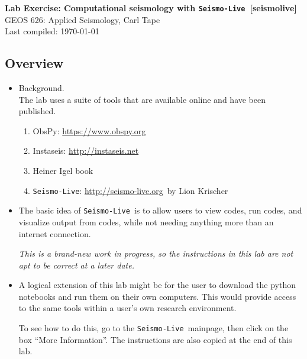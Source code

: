 \documentclass[11pt,titlepage,fleqn]{article}
\newcommand{\slive}{{\tt Seismo-Live}}
\newcommand{\sliveurl}{\url{http://seismo-live.org}}
\begin{document}

\begin{spacing}{1.2}
\centering
{\large \bf Lab Exercise: Computational seismology with \slive\ [seismolive]} \\
GEOS 626: Applied Seismology, Carl Tape \\
Last compiled: \today
\end{spacing}


\subsection*{Overview}

\begin{itemize}

\item Background. \\
The lab uses a suite of tools that are available online and have been published.
\begin{enumerate}
\item ObsPy: \url{https://www.obspy.org} \\
\citet{obspy2010,obspy2011,obspy2015}
\item Instaseis: \url{http://instaseis.net} \\
\citet{instaseis}
\item Heiner Igel book \citep{igel}
\item \slive: \sliveurl\ by Lion Krischer
\end{enumerate}

\item The basic idea of \slive\ is to allow users to view codes, run codes, and visualize output from codes, while not needing anything more than an internet connection.

{\em This is a brand-new work in progress, so the instructions in this lab are not apt to be correct at a later date.}

\item A logical extension of this lab might be for the user to download the python notebooks and run them on their own computers. This would provide access to the same tools within a user's own research environment.

To see how to do this, go to the \slive\ mainpage, then click on the box ``More Information''. The instructions are also copied at the end of this lab.

\end{itemize}
\end{document}
